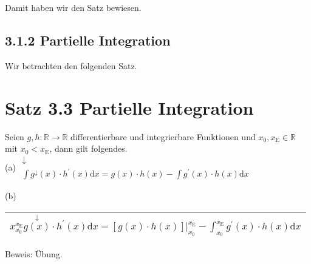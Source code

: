 \documentclass[10pt]{article}
\begin{document}
Damit haben wir den Satz bewiesen.

\subsection*{3.1.2 Partielle Integration}
Wir betrachten den folgenden Satz.

\section*{Satz 3.3 Partielle Integration}
Seien $g, h: \mathbb{R} \rightarrow \mathbb{R}$ differentierbare und integrierbare Funktionen und $x_{0}, x_{\mathrm{E}} \in \mathbb{R}$ mit $x_{0}<x_{\mathrm{E}}$, dann gilt folgendes.\\
(a) $\begin{gathered}\downarrow \\ \int g^{\downarrow}(x) \cdot h^{\prime}(x) \mathrm{d} x=g(x) \cdot h(x)-\int g^{\prime}(x) \cdot h(x) \mathrm{d} x\end{gathered}$

(b) $\quad$\begin{tabular}{c}
$x_{x_{0}}^{x_{\mathrm{E}}} \stackrel{\downarrow}{g(x)} \cdot h^{\prime}(x) \mathrm{d} x=\left.[g(x) \cdot h(x)]\right|_{x_{0}} ^{x_{\mathrm{E}}}-\int_{x_{0}}^{x_{\mathrm{E}}} g^{\prime}(x) \cdot h(x) \mathrm{d} x$ \\
\hline
\end{tabular}

Beweis: Übung.
\end{document}
